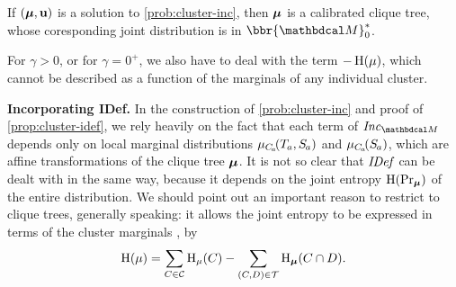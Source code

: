 \documentclass[twoside]{article}
\begin{document}
\begin{prop} \label{prop:cluster-idef}
    If $(\boldsymbol\mu, \mathbf{u})$ is a solution to \eqref{prob:cluster-inc}, then
    $\boldsymbol\mu$ is a calibrated clique tree, whose coresponding joint distribution
    is in $\bbr{\dg M}^*_0$.
\end{prop}

For $\gamma > 0$, or for $\gamma = 0^+$, we also have to deal with the term $-\operatorname{\mathrm{H}}(\mu)$, which cannot be described as a function of the marginals of any individual cluster.

\textbf{Incorporating IDef.}
%
In the construction of \eqref{prob:cluster-inc}
and proof of \cref{prop:cluster-idef}, we rely
heavily on the fact that
each term of $\Inc_{\dg M}$
depends only on local marginal distributions $\mu_{C_{\mskip-2mu a}}\!(\Tgt a,  \Src a)$
and $\mu_{C_{\mskip-2mu a}}\!(\Src a)$,
which are affine transformations of the clique tree $\boldsymbol\mu$.
It is not so clear that $\mathit{IDef}_{\!}$ can be dealt with in the same way, because it depends on the joint entropy $\operatorname{\mathrm{H}}(\Pr_{\boldsymbol\mu})$ of the entire distribution.
We should point out an important reason to restrict to clique trees, generally speaking:
it allows the joint entropy to be expressed
in terms of the cluster marginals \parencite{wainwright2008graphical},
by
\begin{equation}\label{eq:bethe-entropy}
    \operatorname{\mathrm{H}}(\mu)
        = \sum_{C \in \mathcal C} \operatorname{\mathrm{H}}_\mu(C)
        - \sum_{(C,D) \in \mathcal T} \operatorname{\mathrm{H}}_{\boldsymbol\mu}(C \cap D).
\end{equation}
\end{document}
